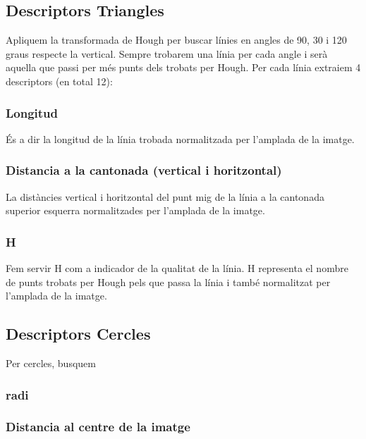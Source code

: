 
\subsection{Descriptors Triangles}

Apliquem la transformada de Hough per buscar línies en angles de 90, 30 i 120 graus respecte la vertical. Sempre trobarem una línia per cada angle i serà aquella que passi 
per més punts dels trobats per Hough. 
Per cada línia extraiem 4 descriptors (en total 12):

\subsubsection{Longitud}

És a dir la longitud de la línia trobada normalitzada per l'amplada de la imatge.

\subsubsection{Distancia a la cantonada (vertical i horitzontal)}

La distàncies vertical i horitzontal del punt mig de la línia a la cantonada 
superior esquerra normalitzades per l'amplada de la imatge.

\subsubsection{H}

Fem servir H com a indicador de la qualitat de la línia. H representa el nombre de
punts trobats per Hough pels que passa la línia i també normalitzat per l'amplada 
de la imatge.


\subsection{Descriptors Cercles}

Per cercles, busquem

\subsubsection{radi}
\subsubsection{Distancia al centre de la imatge}

